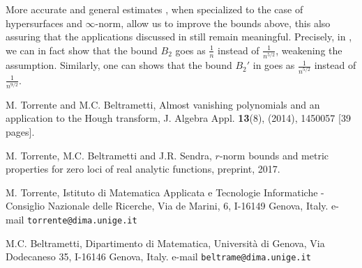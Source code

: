\documentclass[10pt]{article}
\begin{document}
 More accurate and general  estimates \cite{TBS}, when specialized to the case of hypersurfaces and $\infty$-norm,  allow us to improve the bounds above, this also assuring   that the applications discussed in \cite[Section 6]{TB} still remain  meaningful. Precisely, in \cite[Theorem 3.2]{TBS}, we can in fact show that  the bound $B_2$ goes as $\frac{1}{n}$ instead of $\frac{1}{n^{5/2}}$, weakening the assumption. 
Similarly, one can shows that the bound $B_2'$ in \cite[Theorem 4.6]{TBS} goes as $\frac{1}{n^{5/2}}$ instead of $\frac{1}{n^{9/2}}$. 



\small{


\begin{thebibliography}{10}


 M. Torrente and M.C. Beltrametti, Almost  vanishing polynomials and an application to the Hough transform, J.  Algebra Appl. {\bf 13}(8), (2014), 1450057 [39 pages].

 M. Torrente, M.C. Beltrametti and J.R. Sendra, $r$-norm bounds  and metric properties for zero loci of real analytic functions,  preprint, 2017.


\end{thebibliography}

}



\bigskip
\bigskip

\noindent
 M. Torrente, Istituto di Matematica Applicata e Tecnologie Informatiche - Consiglio Nazionale delle Ricerche, 
Via de Marini, 6,
I-16149 Genova, Italy. e-mail {\tt torrente@dima.unige.it}


\smallskip


\noindent M.C. Beltrametti,
Dipartimento di Matematica,
Universit\`a di Genova,
Via Dodecaneso 35,
I-16146 Genova, Italy. e-mail {\tt beltrame@dima.unige.it}
\end{document}
